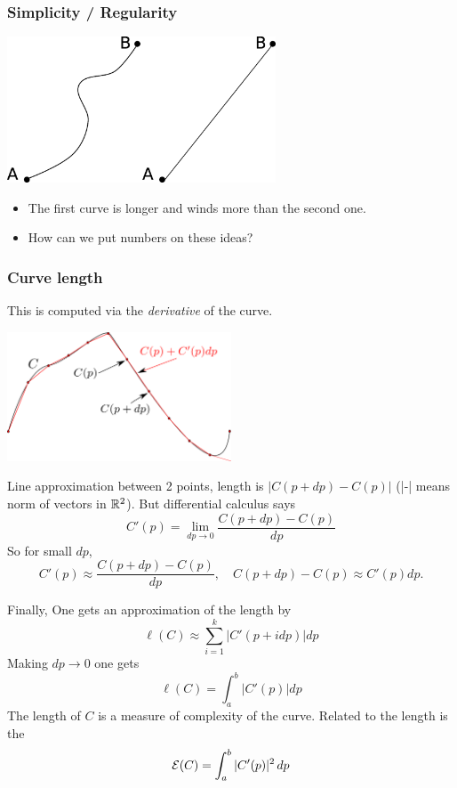 \documentclass[10pt]{beamer}
\newcommand{\myemph}[1]{{\color{blue}{#1}}}
\begin{document}
\begin{frame}
  \frametitle{Simplicity / Regularity}
  \begin{center}
    \includegraphics[width=0.6\textwidth]{FIGURES/curvessimplecomplex}
  \end{center}
  \begin{itemize}
  \item The first curve is longer and winds more than the second one.
  \item How can we put numbers on these ideas?
  \end{itemize}
\end{frame}

\begin{frame}
  \frametitle {Curve length}
  This is computed via the \emph{derivative} of the curve.
  \begin{center}
    \includegraphics[width=0.5\textwidth]{FIGURES/longcrbe}
  \end{center}
  Line approximation between 2 points, length is $|C(p+dp)-C(p)|$ (|-| means norm of vectors in ${\mathbb R}^2$). But differential calculus says
  $$
  C'(p) = \lim_{dp\to 0}\frac{C(p+dp)-C(p)}{dp}
  $$
  So for small $dp$, 
  $$ 
  C'(p) \approx \frac{C(p+dp)-C(p)}{dp},\quad C(p+dp)-C(p)\approx C'(p)dp.
  $$
\end{frame}


%
%
%
%


\begin{frame}
  Finally, One gets an approximation of the length by
  $$
  \ell(C) \approx \sum_{i=1}^k |C'(p+i dp)|dp
  $$
  Making $dp\to 0$ one gets
  $$
  \ell(C) = \int_a^b |C'(p)|dp
  $$
  The length of $C$ is a measure of complexity of the curve. Related to the length is the \myemph{curve energy}
  $$
  {\mathcal E}(C) = \int_a^b |C'(p)|^2\,dp
  $$
\end{frame}
\end{document}
